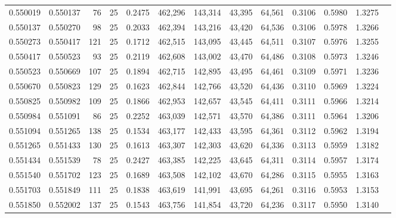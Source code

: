 \begin{tabular}{rrrrrrrrrrrrr}
0.550019 & 0.550137 &    76 &  25 &                                     0.2475 & 462,296 & 143,314 &  43,395 &  64,561 & 0.3106 & 0.5980 & 1.3275 \\
0.550137 & 0.550270 &    98 &  25 &                                     0.2033 & 462,394 & 143,216 &  43,420 &  64,536 & 0.3106 & 0.5978 & 1.3266 \\
0.550273 & 0.550417 &   121 &  25 &                                     0.1712 & 462,515 & 143,095 &  43,445 &  64,511 & 0.3107 & 0.5976 & 1.3255 \\
0.550417 & 0.550523 &    93 &  25 &                                     0.2119 & 462,608 & 143,002 &  43,470 &  64,486 & 0.3108 & 0.5973 & 1.3246 \\
0.550523 & 0.550669 &   107 &  25 &                                     0.1894 & 462,715 & 142,895 &  43,495 &  64,461 & 0.3109 & 0.5971 & 1.3236 \\
0.550670 & 0.550823 &   129 &  25 &                                     0.1623 & 462,844 & 142,766 &  43,520 &  64,436 & 0.3110 & 0.5969 & 1.3224 \\
0.550825 & 0.550982 &   109 &  25 &                                     0.1866 & 462,953 & 142,657 &  43,545 &  64,411 & 0.3111 & 0.5966 & 1.3214 \\
0.550984 & 0.551091 &    86 &  25 &                                     0.2252 & 463,039 & 142,571 &  43,570 &  64,386 & 0.3111 & 0.5964 & 1.3206 \\
0.551094 & 0.551265 &   138 &  25 &                                     0.1534 & 463,177 & 142,433 &  43,595 &  64,361 & 0.3112 & 0.5962 & 1.3194 \\
0.551265 & 0.551433 &   130 &  25 &                                     0.1613 & 463,307 & 142,303 &  43,620 &  64,336 & 0.3113 & 0.5959 & 1.3182 \\
0.551434 & 0.551539 &    78 &  25 &                                     0.2427 & 463,385 & 142,225 &  43,645 &  64,311 & 0.3114 & 0.5957 & 1.3174 \\
0.551540 & 0.551702 &   123 &  25 &                                     0.1689 & 463,508 & 142,102 &  43,670 &  64,286 & 0.3115 & 0.5955 & 1.3163 \\
0.551703 & 0.551849 &   111 &  25 &                                     0.1838 & 463,619 & 141,991 &  43,695 &  64,261 & 0.3116 & 0.5953 & 1.3153 \\
0.551850 & 0.552002 &   137 &  25 &                                     0.1543 & 463,756 & 141,854 &  43,720 &  64,236 & 0.3117 & 0.5950 & 1.3140 \\

\end{tabular}
